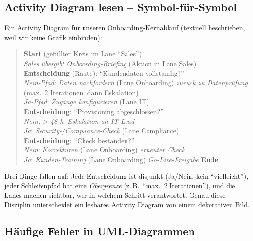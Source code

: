 \documentclass[11pt,a4paper,oneside]{article}
\begin{document}
\subsection{Activity Diagram lesen -- Symbol-für-Symbol}

Ein Activity Diagram für unseren Onboarding-Kernablauf (textuell beschrieben, weil wir keine Grafik einbinden):

\begin{quote}
\textbf{Start} (gefüllter Kreis im Lane ``Sales'') \\
\textrightarrow{} \emph{Sales übergibt Onboarding-Briefing} (Aktion in Lane Sales) \\
\textrightarrow{} \textbf{Entscheidung} (Raute): ``Kundendaten vollständig?'' \\
\qquad \emph{Nein-Pfad}: \textrightarrow{} \emph{Daten nachfordern} (Lane Onboarding) \textrightarrow{} \emph{zurück zu Datenprüfung} (max.\ 2 Iterationen, dann Eskalation) \\
\qquad \emph{Ja-Pfad}: \textrightarrow{} \emph{Zugänge konfigurieren} (Lane IT) \\
\textrightarrow{} \textbf{Entscheidung}: ``Provisioning abgeschlossen?'' \\
\qquad \emph{Nein, > 48 h}: \textrightarrow{} \emph{Eskalation an IT-Lead} \\
\qquad \emph{Ja}: \textrightarrow{} \emph{Security-/Compliance-Check} (Lane Compliance) \\
\textrightarrow{} \textbf{Entscheidung}: ``Check bestanden?'' \\
\qquad \emph{Nein}: \textrightarrow{} \emph{Korrekturen} (Lane Onboarding) \textrightarrow{} \emph{erneuter Check} \\
\qquad \emph{Ja}: \textrightarrow{} \emph{Kunden-Training} (Lane Onboarding) \textrightarrow{} \emph{Go-Live-Freigabe} \textrightarrow{} \textbf{Ende}
\end{quote}

Drei Dinge fallen auf: Jede Entscheidung ist disjunkt (Ja/Nein, kein ``vielleicht''), jeder Schleifenpfad hat eine \emph{Obergrenze} (z.\,B.\ ``max.\ 2 Iterationen''), und die Lanes machen sichtbar, wer in welchem Schritt verantwortet. Genau diese Disziplin unterscheidet ein lesbares Activity Diagram von einem dekorativen Bild.

\subsection{Häufige Fehler in UML-Diagrammen}
\end{document}
